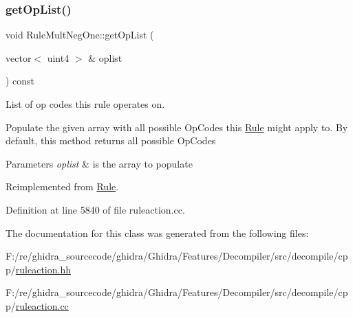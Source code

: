 \subsubsection{\texorpdfstring{getOpList()}{getOpList()}}
{\footnotesize\ttfamily void Rule\+Mult\+Neg\+One\+::get\+Op\+List (\begin{DoxyParamCaption}\item[{vector$<$ uint4 $>$ \&}]{oplist }\end{DoxyParamCaption}) const\hspace{0.3cm}{\ttfamily [virtual]}}



List of op codes this rule operates on. 

Populate the given array with all possible Op\+Codes this \mbox{\hyperlink{class_rule}{Rule}} might apply to. By default, this method returns all possible Op\+Codes 
\begin{DoxyParams}{Parameters}
{\em oplist} & is the array to populate \\
\hline
\end{DoxyParams}


Reimplemented from \mbox{\hyperlink{class_rule_a4023bfc7825de0ab866790551856d10e}{Rule}}.



Definition at line 5840 of file ruleaction.\+cc.



The documentation for this class was generated from the following files\+:\begin{DoxyCompactItemize}
\item 
F\+:/re/ghidra\+\_\+sourcecode/ghidra/\+Ghidra/\+Features/\+Decompiler/src/decompile/cpp/\mbox{\hyperlink{ruleaction_8hh}{ruleaction.\+hh}}\item 
F\+:/re/ghidra\+\_\+sourcecode/ghidra/\+Ghidra/\+Features/\+Decompiler/src/decompile/cpp/\mbox{\hyperlink{ruleaction_8cc}{ruleaction.\+cc}}\end{DoxyCompactItemize}
